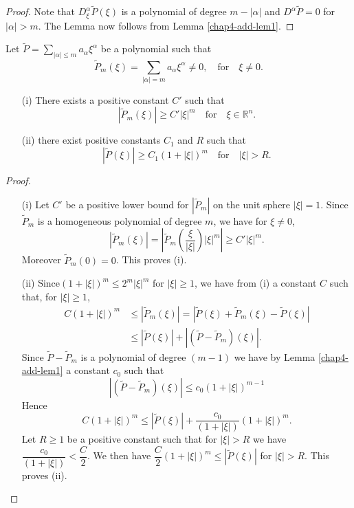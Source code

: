 \begin{proof}
Note that $D^{\alpha}_{\xi}\widetilde{P}(\xi)$ is a polynomial of degree $m-|\alpha|$ and $D^{\alpha}\widetilde{P}=0$ for $|\alpha|>m$. The Lemma now follows from Lemma \ref{chap4-add-lem1}.
\end{proof}

\begin{lemma}\label{chap4-add-lem3}
Let $\widetilde{P}=\sum\limits_{|\alpha|\leq m}a_{\alpha}\xi^{\alpha}$ be a polynomial such that 
$$
\widetilde{P}_{m}(\xi)=\sum\limits_{|\alpha|=m}a_{\alpha}\xi^{\alpha}\neq 0,\quad\text{for}\quad \xi\neq 0.
$$
\begin{itemize}
\item[\rm(i)] There exists a positive constant $C'$ such that
$$
|\widetilde{P}_{m}(\xi)|\geq C'|\xi|^{m}\quad\text{for}\quad \xi\in \mathbb{R}^{n}.
$$

\item[\rm(ii)] there exist positive constants $C_{1}$ and $R$ such that
$$
|\widetilde{P}(\xi)|\geq C_{1}(1+|\xi|)^{m}\quad\text{for}\quad |\xi|>R.
$$
\end{itemize}
\end{lemma}

\begin{proof}
\begin{itemize}
\item[(i)] Let $C'$ be a positive lower bound for $|\widetilde{P}_{m}|$ on the unit sphere $|\xi|=1$. Since $\widetilde{P}_{m}$ is a homogeneous polynomial of degree $m$, we have for $\xi\neq 0$,
$$
|\widetilde{P}_{m}(\xi)|=\left|\widetilde{P}_{m}\left(\frac{\xi}{|\xi|}\right)|\xi|^{m}\right|\geq C'|\xi|^{m}.
$$
Moreover $\widetilde{P}_{m}(0)=0$. This proves (i).

\item[(ii)] Since\pageoriginale $(1+|\xi|)^{m}\leq 2^{m}|\xi|^{m}$ for $|\xi|\geq 1$, we have from (i) a constant $C$ such that, for $|\xi|\geq 1$,
\begin{align*}
C(1+|\xi|)^{m} &\leq |\widetilde{P}_{m}(\xi)|=|\widetilde{P}(\xi)+\widetilde{P}_{m}(\xi)-\widetilde{P}(\xi)|\\[3pt]
&\leq |\widetilde{P}(\xi)|+|(\widetilde{P}-\widetilde{P}_{m})(\xi)|.
\end{align*}
Since $\widetilde{P}-\widetilde{P}_{m}$ is a polynomial of degree $(m-1)$ we have by Lemma \ref{chap4-add-lem1} a constant $c_{0}$ such that
$$
|(\widetilde{P}-\widetilde{P}_{m})(\xi)|\leq c_{0}(1+|\xi|)^{m-1}
$$
Hence
$$
C(1+|\xi|)^{m}\leq |\widetilde{P}(\xi)|+\dfrac{c_{0}}{(1+|\xi|)}(1+|\xi|)^{m}.
$$
Let $R\geq 1$ be a positive constant such that for $|\xi|>R$ we have $\dfrac{c_{0}}{(1+|\xi|)}<\dfrac{C}{2}$. We then have $\dfrac{C}{2}(1+|\xi|)^{m}\leq |\widetilde{P}(\xi)|$ for $|\xi|>R$. This proves (ii).
\end{itemize}
\end{proof}

